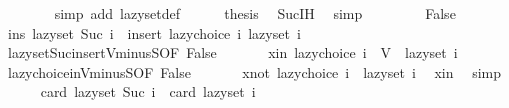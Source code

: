 \begin{isabellebody}
\ \ \ \ \ \ \isamarkupfalse%
\ {\isacharparenleft}{\kern0pt}simp\ add{\isacharcolon}{\kern0pt}\ lazy{\isacharunderscore}{\kern0pt}set{\isacharunderscore}{\kern0pt}def{\isacharparenright}{\kern0pt}\isanewline
\ \ \ \ \isamarkupfalse%
\ {\isacharquery}{\kern0pt}thesis\ \isamarkupfalse%
\ Suc{\isachardot}{\kern0pt}IH\ \isamarkupfalse%
\ simp\isanewline
\ \ \isamarkupfalse%
\isanewline
\ \ \ \ \isamarkupfalse%
\ False\isanewline
\ \ \ \ \isamarkupfalse%
\ ins{\isacharcolon}{\kern0pt}\ {\isachardoublequoteopen}lazy{\isacharunderscore}{\kern0pt}set\ {\isacharparenleft}{\kern0pt}Suc\ i{\isacharparenright}{\kern0pt}\ {\isacharequal}{\kern0pt}\ insert\ {\isacharparenleft}{\kern0pt}lazy{\isacharunderscore}{\kern0pt}choice\ i{\isacharparenright}{\kern0pt}\ {\isacharparenleft}{\kern0pt}lazy{\isacharunderscore}{\kern0pt}set\ i{\isacharparenright}{\kern0pt}{\isachardoublequoteclose}\isanewline
\ \ \ \ \ \ \isamarkupfalse%
\ lazy{\isacharunderscore}{\kern0pt}set{\isacharunderscore}{\kern0pt}Suc{\isacharunderscore}{\kern0pt}insert{\isacharunderscore}{\kern0pt}V{\isacharunderscore}{\kern0pt}minus{\isacharunderscore}{\kern0pt}S{\isacharbrackleft}{\kern0pt}OF\ False{\isacharbrackright}{\kern0pt}\ \isakeywordONE{{\isachardot}{\kern0pt}}\isamarkupfalse%
\isanewline
\ \ \ \ \isamarkupfalse%
\ xin{\isacharcolon}{\kern0pt}\ {\isachardoublequoteopen}lazy{\isacharunderscore}{\kern0pt}choice\ i\ {\isasymin}\ V\ {\isacharminus}{\kern0pt}\ lazy{\isacharunderscore}{\kern0pt}set\ i{\isachardoublequoteclose}\isanewline
\ \ \ \ \ \ \isamarkupfalse%
\ lazy{\isacharunderscore}{\kern0pt}choice{\isacharunderscore}{\kern0pt}in{\isacharunderscore}{\kern0pt}V{\isacharunderscore}{\kern0pt}minus{\isacharunderscore}{\kern0pt}S{\isacharbrackleft}{\kern0pt}OF\ False{\isacharbrackright}{\kern0pt}\ \isakeywordONE{{\isachardot}{\kern0pt}}\isamarkupfalse%
\isanewline
\ \ \ \ \isamarkupfalse%
\ xnot{\isacharcolon}{\kern0pt}\ {\isachardoublequoteopen}lazy{\isacharunderscore}{\kern0pt}choice\ i\ {\isasymnotin}\ lazy{\isacharunderscore}{\kern0pt}set\ i{\isachardoublequoteclose}\ \isamarkupfalse%
\ xin\ \isamarkupfalse%
\ simp\isanewline
\ \ \ \ \isamarkupfalse%
\ {\isachardoublequoteopen}card\ {\isacharparenleft}{\kern0pt}lazy{\isacharunderscore}{\kern0pt}set\ {\isacharparenleft}{\kern0pt}Suc\ i{\isacharparenright}{\kern0pt}{\isacharparenright}{\kern0pt}\ {\isacharequal}{\kern0pt}\ card\ {\isacharparenleft}{\kern0pt}lazy{\isacharunderscore}{\kern0pt}set\ i{\isacharparenright}{\kern0pt}\ {\isacharplus}{\kern0pt}\ {}{\isachardoublequoteclose}\isanewline

\end{isabellebody}
